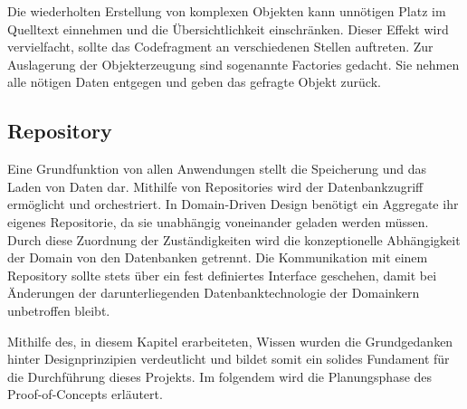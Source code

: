 Die wiederholten Erstellung von komplexen Objekten kann unnötigen Platz im Quelltext einnehmen und die Übersichtlichkeit einschränken. Dieser Effekt wird vervielfacht, sollte das Codefragment an verschiedenen Stellen auftreten. Zur Auslagerung der Objekterzeugung sind sogenannte Factories gedacht. Sie nehmen alle nötigen Daten entgegen und geben das gefragte Objekt zurück.

\subsection{Repository}

Eine Grundfunktion von allen Anwendungen stellt die Speicherung und das Laden von Daten dar. Mithilfe von Repositories wird der Datenbankzugriff ermöglicht und orchestriert. In Domain-Driven Design benötigt ein Aggregate ihr eigenes Repositorie, da sie unabhängig voneinander geladen werden müssen. Durch diese Zuordnung der Zuständigkeiten wird die konzeptionelle Abhängigkeit der Domain von den Datenbanken getrennt. Die Kommunikation mit einem Repository sollte stets über ein fest definiertes Interface geschehen, damit bei Änderungen der darunterliegenden Datenbanktechnologie der Domainkern unbetroffen bleibt. 


Mithilfe des, in diesem Kapitel erarbeiteten, Wissen wurden die Grundgedanken hinter Designprinzipien verdeutlicht und bildet somit ein solides Fundament für die Durchführung dieses Projekts. Im folgendem wird die Planungsphase des Proof-of-Concepts erläutert.


















































